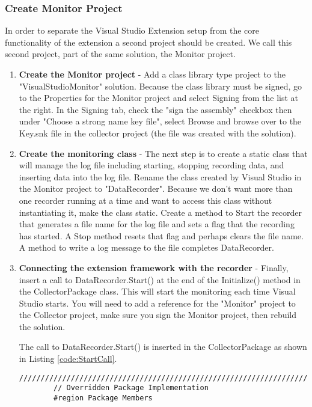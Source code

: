 \subsubsection{Create Monitor Project}

In order to separate the Visual Studio Extension setup from the core functionality of the extension a second project should be created. We call this second project, part of the same solution, the Monitor project.

\begin{enumerate}
\item {\bf Create the Monitor project} - Add a class library type project to  the "VisualStudioMonitor" solution. Because the class library must be signed, go to the Properties for the Monitor project and select Signing from the list at the right.  In the Signing tab, check the "sign the assembly" checkbox then under "Choose a strong name key file", select Browse and browse over to the Key.snk file in the collector project (the file was created with the solution).

\item {\bf Create the monitoring class} - 
The next step is to create a static class that will manage the log file including starting, stopping recording data, and inserting data into the log file.  Rename the class created by Visual Studio in the Monitor project to "DataRecorder".    Because we don't want more than one recorder running at a time and want to access this class without instantiating it, make the class static.  Create a method to Start the recorder that generates a file name for the log file and sets a flag that the recording has started. A Stop method resets that flag and perhaps clears the file name.  A method to write a log message to the file completes DataRecorder.

\item {\bf Connecting the extension framework with the recorder} -
Finally, insert a call to DataRecorder.Start() at the end of the Initialize() method in the CollectorPackage class.  This will start the monitoring each time Visual Studio starts.  You will need to add a reference for the "Monitor" project to the Collector project, make sure you sign the Monitor project, then rebuild the solution.


The call to DataRecorder.Start() is inserted in the CollectorPackage as shown in Listing \ref{code:StartCall}.
\begin{lstlisting}[caption=Call to DataRecorder.Start(),label=code:StartCall]
        /////////////////////////////////////////////////////////////////////////////
        // Overridden Package Implementation
        #region Package Members


\end{lstlisting}
\end{enumerate}
